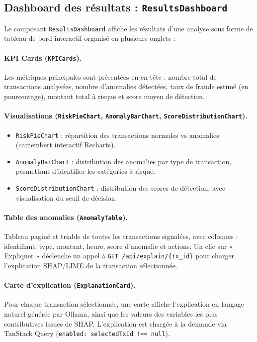 \documentclass[12pt,a4paper,twoside]{report}
\begin{document}
\subsection{Dashboard des résultats : \texttt{ResultsDashboard}}

Le composant \texttt{ResultsDashboard} affiche les résultats d'une analyse sous forme de tableau de bord interactif organisé en plusieurs onglets :

\paragraph{KPI Cards (\texttt{KPICards}).}
Les métriques principales sont présentées en en-tête : nombre total de transactions analysées, nombre d'anomalies détectées, taux de fraude estimé (en pourcentage), montant total à risque et score moyen de détection.

\paragraph{Visualisations (\texttt{RiskPieChart}, \texttt{AnomalyBarChart}, \texttt{ScoreDistributionChart}).}

\begin{itemize}
  \item \texttt{RiskPieChart} : répartition des transactions normales vs anomalies (camembert interactif Recharts).
  \item \texttt{AnomalyBarChart} : distribution des anomalies par type de transaction, permettant d'identifier les catégories à risque.
  \item \texttt{ScoreDistributionChart} : distribution des scores de détection, avec visualisation du seuil de décision.
\end{itemize}

\paragraph{Table des anomalies (\texttt{AnomalyTable}).}
Tableau paginé et triable de toutes les transactions signalées, avec colonnes : identifiant, type, montant, heure, score d'anomalie et actions. Un clic sur « Expliquer » déclenche un appel à \texttt{GET /api/explain/\{tx\_id\}} pour charger l'explication SHAP/LIME de la transaction sélectionnée.

\paragraph{Carte d'explication (\texttt{ExplanationCard}).}
Pour chaque transaction sélectionnée, une carte affiche l'explication en langage naturel générée par Ollama, ainsi que les valeurs des variables les plus contributives issues de SHAP. L'explication est chargée à la demande via TanStack Query (\texttt{enabled: selectedTxId !== null}).
\end{document}
